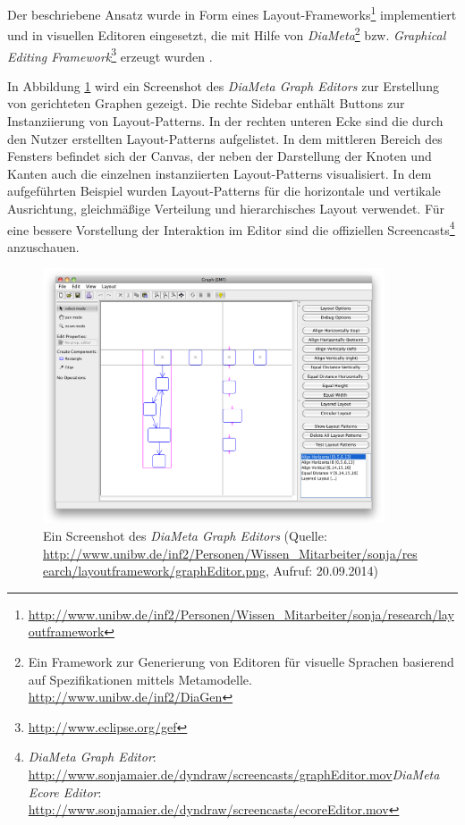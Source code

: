 Der beschriebene Ansatz wurde in Form eines Layout-Frameworks\footnote{\url{http://www.unibw.de/inf2/Personen/Wissen_Mitarbeiter/sonja/research/layoutframework}} implementiert und in visuellen Editoren eingesetzt, die mit Hilfe von \textit{DiaMeta}\footnote{Ein Framework zur Generierung von Editoren für visuelle Sprachen basierend auf Spezifikationen mittels Metamodelle. \url{http://www.unibw.de/inf2/DiaGen}} bzw. \textit{Graphical Editing Framework}\footnote{\url{http://www.eclipse.org/gef}} erzeugt wurden \cite{Maier12A-Pattern-based}.

In Abbildung \ref{fig:diameta-graph-editor-screenshot} wird ein Screenshot des \textit{DiaMeta Graph Editors} zur Erstellung von gerichteten Graphen gezeigt. Die rechte Sidebar enthält Buttons zur Instanziierung von Layout-Patterns. In der rechten unteren Ecke sind die durch den Nutzer erstellten Layout-Patterns aufgelistet. In dem mittleren Bereich des Fensters befindet sich der Canvas, der neben der Darstellung der Knoten und Kanten auch die einzelnen instanziierten Layout-Patterns visualisiert. In dem aufgeführten Beispiel wurden Layout-Patterns für die horizontale und vertikale Ausrichtung, gleichmäßige Verteilung und hierarchisches Layout verwendet. Für eine bessere Vorstellung der Interaktion im Editor sind die offiziellen Screencasts\footnote{\textit{DiaMeta Graph Editor}: \url{http://www.sonjamaier.de/dyndraw/screencasts/graphEditor.mov}\newline\textit{DiaMeta Ecore Editor}: \url{http://www.sonjamaier.de/dyndraw/screencasts/ecoreEditor.mov}} anzuschauen.

\begin{figure}[hbt]
    \centering
    \includegraphics[width=0.9\textwidth]{resources/diameta-graph-editor-screenshot}
    \newcommand{\captionvalue}{Ein Screenshot des \textit{DiaMeta Graph Editors}}
    \caption[\captionvalue]{\captionvalue{ }(Quelle: \url{http://www.unibw.de/inf2/Personen/Wissen_Mitarbeiter/sonja/research/layoutframework/graphEditor.png}, Aufruf: 20.09.2014)}
    \label{fig:diameta-graph-editor-screenshot}
\end{figure}

